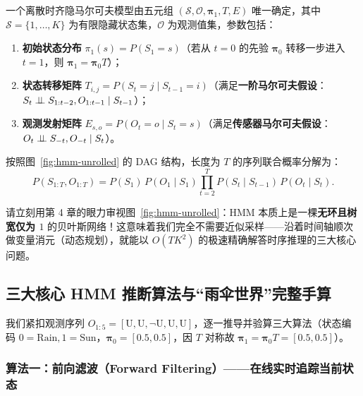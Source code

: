 \begin{defBox}
\begin{definition}\label{def:hmm}
一个离散时齐隐马尔可夫模型由五元组 $(\mathcal{S}, \mathcal{O}, \boldsymbol{\pi}_1, T, E)$ 唯一确定，其中 $\mathcal{S} = \{1, \dots, K\}$ 为有限隐藏状态集，$\mathcal{O}$ 为观测值集，参数包括：
\begin{enumerate}
  \item \textbf{初始状态分布} $\pi_1(s) = P(S_1 = s)$（若从 $t=0$ 的先验 $\boldsymbol{\pi}_0$ 转移一步进入 $t=1$，则 $\boldsymbol{\pi}_1 = \boldsymbol{\pi}_0 T$）；
  \item \textbf{状态转移矩阵} $T_{i,j} = P(S_t = j \mid S_{t-1} = i)$（满足\textbf{一阶马尔可夫假设}：$S_t \perp\!\!\!\perp S_{1:t-2}, O_{1:t-1} \mid S_{t-1}$）；
  \item \textbf{观测发射矩阵} $E_{s, o} = P(O_t = o \mid S_t = s)$（满足\textbf{传感器马尔可夫假设}：$O_t \perp\!\!\!\perp S_{-t}, O_{-t} \mid S_t$）。
\end{enumerate}
按照图~\ref{fig:hmm-unrolled} 的 DAG 结构，长度为 $T$ 的序列联合概率分解为：
\begin{equation}\label{eq:hmm-joint}
  P(S_{1:T}, O_{1:T}) = P(S_1)\, P(O_1 \mid S_1) \prod_{t=2}^{T} P(S_t \mid S_{t-1})\, P(O_t \mid S_t).
\end{equation}
\end{definition}
\end{defBox}

请立刻用第 4 章的眼力审视图~\ref{fig:hmm-unrolled}：HMM 本质上是一棵\textbf{无环且树宽仅为 $1$} 的贝叶斯网络！这意味着我们完全不需要近似采样——沿着时间轴顺次做变量消元（动态规划），就能以 $O(T K^2)$ 的极速精确解答时序推理的三大核心问题。

\subsection{三大核心 HMM 推断算法与“雨伞世界”完整手算}

我们紧扣观测序列 $O_{1:5} = [\text{U}, \text{U}, \neg\text{U}, \text{U}, \text{U}]$，逐一推导并验算三大算法（状态编码 $0=\text{Rain}, 1=\text{Sun}$，$\boldsymbol{\pi}_0 = [0.5, 0.5]$，因 $T$ 对称故 $\boldsymbol{\pi}_1 = \boldsymbol{\pi}_0 T = [0.5, 0.5]$）。

\subsubsection{算法一：前向滤波（Forward Filtering）——在线实时追踪当前状态}

